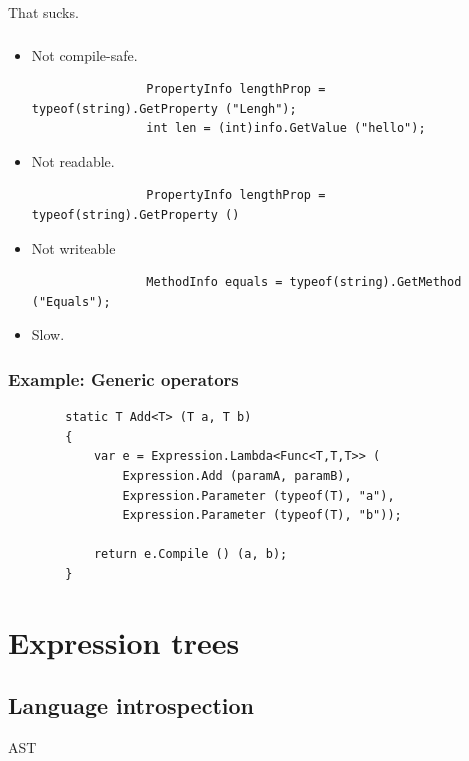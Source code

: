 \documentclass{beamer}
\begin{document}
	\begin{frame}
		\Huge That sucks.
	\end{frame}

	\begin{frame}[fragile]
		\frametitle{}
		\begin{itemize}
			\item Not compile-safe.
				\pause
				\begin{verbatim}
				PropertyInfo lengthProp = typeof(string).GetProperty ("Lengh");
				int len = (int)info.GetValue ("hello");
				\end{verbatim}
				\pause
			\item Not readable.
				\pause
				\begin{verbatim}
				PropertyInfo lengthProp = typeof(string).GetProperty ()
				\end{verbatim}
				\pause
			\item Not writeable
				\pause
				\begin{verbatim}
				MethodInfo equals = typeof(string).GetMethod ("Equals");
				\end{verbatim}
				\pause
			\item Slow. \pause
		\end{itemize}
	\end{frame}

	\begin{frame}
	\end{frame}

	\begin{frame}[fragile]
		\frametitle{Example: Generic operators}
		\begin{verbatim}
		static T Add<T> (T a, T b)
		{
	    	var e = Expression.Lambda<Func<T,T,T>> (
	        	Expression.Add (paramA, paramB),
	        	Expression.Parameter (typeof(T), "a"),
	        	Expression.Parameter (typeof(T), "b"));

	    	return e.Compile () (a, b);
		}
		\end{verbatim}
	\end{frame}

\section{Expression trees}
\subsection{Language introspection}
	\begin{frame}
		AST
	\end{frame}
	\begin{frame}
	\end{frame}
\end{document}
